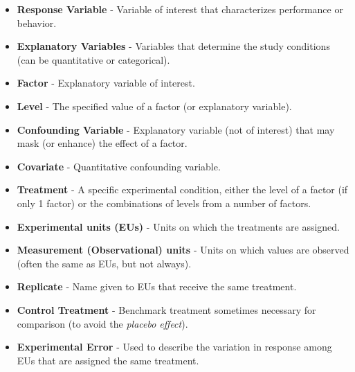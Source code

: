 \begin{itemize}
\item \textbf{Response Variable} - Variable of interest that characterizes performance or behavior.
\item \textbf{Explanatory Variables} - Variables that determine the study conditions (can be quantitative or categorical).
\item \textbf{Factor} - Explanatory variable of interest.
\item \textbf{Level} -	The specified value of a factor (or explanatory variable).
\item \textbf{Confounding Variable} - Explanatory variable (not of interest) that may mask (or enhance) the effect of a factor.
\item \textbf{Covariate} - Quantitative confounding variable.
\item \textbf{Treatment} - A specific experimental condition, either the level of a factor (if only 1 factor) or the combinations of levels from a number of factors.
\item \textbf{Experimental units (EUs)} - Units on which the treatments are assigned.
\item \textbf{Measurement (Observational) units} - Units on which values are observed (often the same as EUs, but not always).
\item \textbf{Replicate} - Name given to EUs that receive the same treatment.
\item \textbf{Control Treatment} - Benchmark treatment sometimes necessary for comparison (to avoid the \textit{placebo effect}).
\item \textbf{Experimental Error} - Used to describe the variation in response among EUs that are assigned the same treatment.
\end{itemize}

